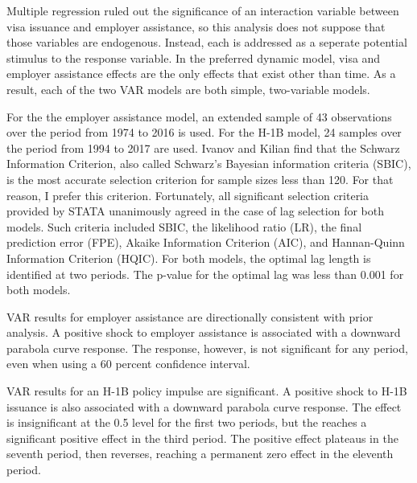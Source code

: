 \documentclass[review]{elsarticle}
\begin{document}
    Multiple regression ruled out the significance of an interaction variable between
    visa issuance and employer assistance,
    so this analysis does not suppose that those variables are endogenous.
    Instead, each is addressed as a seperate potential stimulus to the response variable.
    In the preferred dynamic model, visa and employer assistance effects
    are the only effects that exist other than time.
    As a result, each of the two VAR models are both simple, two-variable models.

    For the the employer assistance model,
    an extended sample of 43 observations
    over the period from 1974 to 2016 is used.
    For the H-1B model, 24 samples over the period from 1994 to 2017 are used.
    Ivanov and Kilian find that the Schwarz Information Criterion,
    also called Schwarz's Bayesian information criteria (SBIC),
    is the most accurate selection criterion for sample sizes less than 120\cite{ivanov2005practitioner}.
    For that reason, I prefer this criterion.
    Fortunately, all significant selection criteria provided by STATA unanimously agreed in the case of lag selection for both models.
    Such criteria included SBIC, the likelihood ratio (LR), the final prediction error (FPE),
    Akaike Information Criterion (AIC), and Hannan-Quinn Information Criterion (HQIC).
    For both models, the optimal lag length is identified at two periods.
    The p-value for the optimal lag was less than 0.001 for both models.
    
    VAR results for employer assistance are directionally consistent with prior analysis.
    A positive shock to employer assistance is associated with a downward parabola curve response.
    The response, however, is not significant for any period, even when using a 60 percent confidence interval.

    VAR results for an H-1B policy impulse are significant.
    A positive shock to H-1B issuance is also associated with a downward parabola curve response.
    The effect is insignificant at the 0.5 level for the first two periods,
    but the reaches a significant positive effect in the third period.
    The positive effect plateaus in the seventh period, then reverses,
    reaching a permanent zero effect in the eleventh period.
\end{document}
